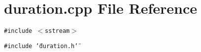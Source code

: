 \section{duration.cpp File Reference}
\label{duration_8cpp}
{\tt \#include $<$sstream$>$}\par
{\tt \#include \char`\"{}duration.h\char`\"{}}\par
